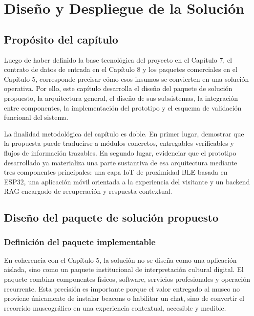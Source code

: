 \chapter{Diseño y Despliegue de la Solución}

\section{Propósito del capítulo}

Luego de haber definido la base tecnológica del proyecto en el Capítulo 7, el contrato de datos de entrada en el Capítulo 8 y los paquetes comerciales en el Capítulo 5, corresponde precisar cómo esos insumos se convierten en una solución operativa. Por ello, este capítulo desarrolla el diseño del paquete de solución propuesto, la arquitectura general, el diseño de sus subsistemas, la integración entre componentes, la implementación del prototipo y el esquema de validación funcional del sistema.

La finalidad metodológica del capítulo es doble. En primer lugar, demostrar que la propuesta puede traducirse a módulos concretos, entregables verificables y flujos de información trazables. En segundo lugar, evidenciar que el prototipo desarrollado ya materializa una parte sustantiva de esa arquitectura mediante tres componentes principales: una capa IoT de proximidad BLE basada en ESP32, una aplicación móvil orientada a la experiencia del visitante y un backend RAG encargado de recuperación y respuesta contextual.

\section{Diseño del paquete de solución propuesto}

\subsection{Definición del paquete implementable}

En coherencia con el Capítulo 5, la solución no se diseña como una aplicación aislada, sino como un paquete institucional de interpretación cultural digital. El paquete combina componentes físicos, software, servicios profesionales y operación recurrente. Esta precisión es importante porque el valor entregado al museo no proviene únicamente de instalar beacons o habilitar un chat, sino de convertir el recorrido museográfico en una experiencia contextual, accesible y medible.

